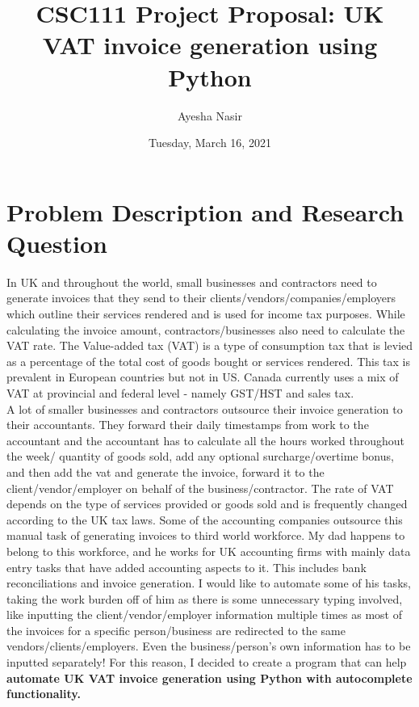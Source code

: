 \documentclass[fontsize=11pt]{article}
\title{CSC111 Project Proposal: UK VAT invoice generation using Python}
\author{Ayesha Nasir}
\date{Tuesday, March 16, 2021}
\begin{document}
    \maketitle

    \section*{Problem Description and Research Question}
    In UK and throughout the world, small businesses and contractors need to generate invoices that they send to their clients/vendors/companies/employers which outline their services rendered and is used for income tax purposes. While calculating the invoice amount, contractors/businesses also need to calculate the VAT rate. The Value-added tax (VAT) is a type of consumption tax that is levied as a percentage of the total cost of goods bought or services rendered. This tax is prevalent in European countries but not in US. Canada currently uses a mix of VAT at provincial and federal level - namely GST/HST and sales tax. \\
    A lot of smaller businesses and contractors outsource their invoice generation to their accountants. They forward their daily timestamps from work to the accountant and the accountant has to calculate all the hours worked throughout the week/ quantity of goods sold, add any optional surcharge/overtime bonus, and then add the vat and generate the invoice, forward it to the client/vendor/employer on behalf of the business/contractor. The rate of VAT depends on the type of services provided or goods sold and is frequently changed according to the UK tax laws. Some of the accounting companies outsource this manual task of generating invoices to third world workforce. My dad happens to belong to this workforce, and he works for UK accounting firms with mainly data entry tasks that have added accounting aspects to it. This includes bank reconciliations and invoice generation. I would like to automate some of his tasks, taking the work burden off of him as there is some unnecessary typing involved, like inputting the client/vendor/employer information multiple times as most of the invoices for a specific person/business are redirected to the same vendors/clients/employers. Even the business/person's own information has to be inputted separately! For this reason, I decided to create a program that can help \textbf{automate UK VAT invoice generation using Python with autocomplete functionality.}
\end{document}
